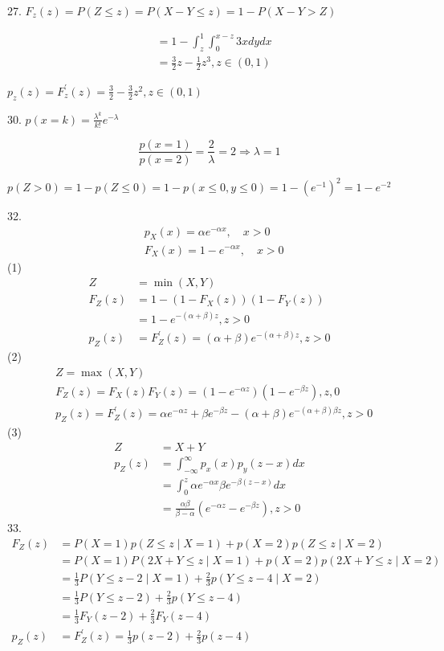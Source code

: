 \documentclass[14pt]{scrartcl} %
\numberwithin{equation}{section} %
\numberwithin{figure}{section} %
\numberwithin{table}{section} %
\begin{document}
	27. $F_{z}(z)=P(Z \leqslant z)=P(X - Y \leqslant z)=1-P(X-Y>Z)$
	
	$$
	\begin{aligned}
		& =1-\int_{z}^{1} \int_{0}^{x-z} 3 x d y d x \\
		& =\frac{3}{2} z-\frac{1}{2} z^{3}, z \in(0,1)
	\end{aligned}
	$$
	
	$p_{z}(z)=F_{z}^{\prime}(z)=\frac{3}{2}-\frac{3}{2} z^{2}, z \in(0,1)$
	
	30. $p(x=k)=\frac{\lambda^{k}}{k !} e^{-\lambda}$
	
	$$
	\frac{p(x=1)}{p(x=2)}=\frac{2}{\lambda}=2 \Rightarrow \lambda=1
	$$
	
	$p(Z>0)=1-p(Z \leq 0)=1-p(x \leq 0, y \leq 0)=1-\left(e^{-1}\right)^{2}=1 - e^{-2}$

32.
\[
\begin{aligned}
	& p_X(x)=\alpha e^{-\alpha x}, \quad x>0 \\
	& F_X(x)=1-e^{-\alpha x}, \quad x>0
\end{aligned}
\]
(1)
\[
\begin{aligned}
	Z&=\min (X, Y) \\
	F_Z(z)&=1 -  \left(1-F_X(z)\right)\left(1-F_Y(z)\right) \\
	& =1-e^{-(\alpha+\beta) z}, z>0 \\
	p_Z(z)&=F_Z^{\prime}(z)=(\alpha+\beta) e^{-(\alpha+\beta) z}, z>0
\end{aligned}
\]
(2)
\[
\begin{aligned}
	& Z=\max (X, Y) \\
	& F_Z(z)=F_X(z) F_Y(z)=\left(1-e^{-\alpha z}\right)\left(1-e^{-\beta z}\right), z, 0 \\
	& p_Z(z)=F_Z^{\prime}(z)=\alpha e^{-\alpha z}+\beta e^{-\beta z}-(\alpha+\beta) e^{-(\alpha + \beta) \beta z}, z>0
\end{aligned}
\]
(3)
\[
\begin{aligned}
	Z& =X+Y\\
	p_Z(z) & =\int_{-\infty}^{\infty} p_x(x) p_y(z-x) d x \\
	& =\int_0^z \alpha e^{-\alpha x} \beta e^{-\beta(z-x)} d x \\
	& =\frac{\alpha \beta}{\beta-\alpha}\left(e^{-\alpha z}-e^{-\beta z}\right), z>0
\end{aligned}
\]
33.
\[
\begin{aligned}
	F_Z(z) & =P(X=1) p(Z\leq z \mid X=1)+p(X=2) p(Z \leq z \mid X=2) \\
	& =P(X=1) P(2 X+Y \leq z \mid X=1)+p(X=2) p(2X+Y \leq z \mid X=2) \\
	& =\frac{1}{3} P(Y \leq z-2 \mid X=1)+\frac{2}{3} p(Y \leq z-4 \mid X=2) \\
	& =\frac{1}{3} P(Y \leq z-2)+\frac{2}{3} p(Y \leq z-4) \\
	& =\frac{1}{3} F_Y(z-2)+\frac{2}{3} F_Y(z-4) \\
	p_Z(z) & =F_Z^{\prime}(z)=\frac{1}{3} p(z-2)+\frac{2}{3} p(z-4)
\end{aligned}
\]
	
	
\end{document}
